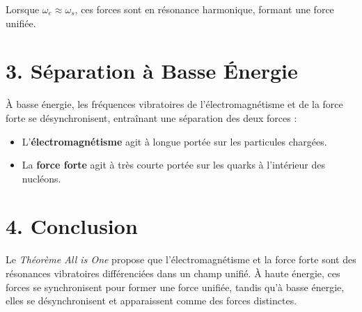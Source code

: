 \documentclass{article}
\begin{document}
Lorsque \( \omega_e \approx \omega_s \), ces forces sont en résonance harmonique, formant une force unifiée.

\section{3. Séparation à Basse Énergie}

À basse énergie, les fréquences vibratoires de l'électromagnétisme et de la force forte se désynchronisent, entraînant une séparation des deux forces :
\begin{itemize}
    \item L'\textbf{électromagnétisme} agit à longue portée sur les particules chargées.
    \item La \textbf{force forte} agit à très courte portée sur les quarks à l'intérieur des nucléons.
\end{itemize}

\section{4. Conclusion}

Le \textit{Théorème All is One} propose que l'électromagnétisme et la force forte sont des résonances vibratoires différenciées dans un champ unifié. À haute énergie, ces forces se synchronisent pour former une force unifiée, tandis qu'à basse énergie, elles se désynchronisent et apparaissent comme des forces distinctes.
\end{document}
